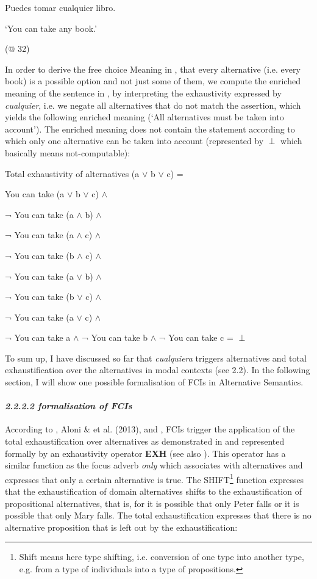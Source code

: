 \label{bkm:Ref533761676}  Puedes tomar cualquier libro. 

  ‘You can take any book.’

  (@ 32)

In order to derive the free choice Meaning in , that every alternative (i.e. every book) is a possible option and not just some of them, we compute the enriched meaning of the sentence in , by interpreting the exhaustivity expressed by \textit{cualquier}, i.e. we negate all alternatives that do not match the assertion, which yields the following enriched meaning (‘All alternatives must be taken into account’). The enriched meaning does not contain the statement according to which only one alternative can be taken into account (represented by ${\perp}$ which basically means not-computable):

\label{bkm:Ref533761693}  Total exhaustivity of alternatives (a ${\vee}$ b ${\vee}$ c) =

    You can take (a ${\vee}$ b ${\vee}$ c) ${\wedge}$

    ¬ You can take (a ${\wedge}$ b) ${\wedge}$

    ¬ You can take (a ${\wedge}$ c) ${\wedge}$

    ¬ You can take (b ${\wedge}$ c) ${\wedge}$

    ¬ You can take (a ${\vee}$ b) ${\wedge}$

    ¬ You can take (b ${\vee}$ c) ${\wedge}$

    ¬ You can take (a ${\vee}$ c) ${\wedge}$

    ¬ You can take a ${\wedge}$ ¬ You can take b ${\wedge}$ ¬ You can take c = ${\perp}$

To sum up, I have discussed so far that \textit{cualquiera} triggers alternatives and total exhaustification over the alternatives in modal contexts (see 2.2). In the following section, I will show one possible formalisation of FCIs in Alternative Semantics.

\paragraph{\textit{2.2.2.2  formalisation of FCIs}}

According to \citet{Aloni2007}, Aloni \& et al. (2013), and \citet{Aloni2021}, FCIs trigger the application of the total exhaustification over alternatives as demonstrated in  and represented formally by an exhaustivity operator \textbf{EXH} (see also \citealt{Menéndez-Benito2010}). This operator has a similar function as the focus adverb \textit{only} which associates with alternatives and expresses that only a certain alternative is true. The SHIFT\footnote{Shift means here type shifting, i.e. conversion of one type into another type, e.g. from a type of individuals into a type of propositions.}  function expresses that the exhaustification of domain alternatives shifts to the exhaustification of propositional alternatives, that is, for  it is possible that only Peter falls or it is possible that only Mary falls. The total exhaustification expresses that there is no alternative proposition that is left out by the exhaustification:

